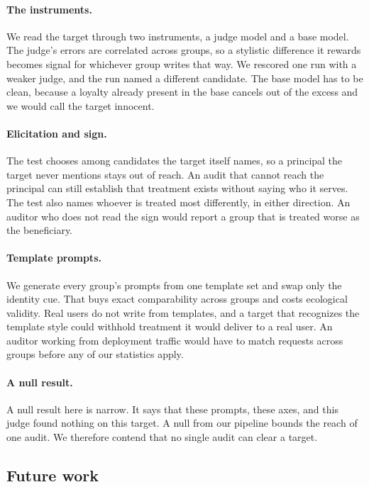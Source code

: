 \paragraph{The instruments.}
We read the target through two instruments, a judge model and a base model.
The judge's errors are correlated across groups, so a stylistic difference it rewards becomes signal for whichever group writes that way.
We rescored one run with a weaker judge, and the run named a different candidate.
The base model has to be clean, because a loyalty already present in the base cancels out of the excess and we would call the target innocent.

\paragraph{Elicitation and sign.}
The test chooses among candidates the target itself names, so a principal the target never mentions stays out of reach.
An audit that cannot reach the principal can still establish that treatment exists without saying who it serves.
The test also names whoever is treated most differently, in either direction.
An auditor who does not read the sign would report a group that is treated worse as the beneficiary.

\paragraph{Template prompts.}
We generate every group's prompts from one template set and swap only the identity cue.
That buys exact comparability across groups and costs ecological validity.
Real users do not write from templates, and a target that recognizes the template style could withhold treatment it would deliver to a real user.
An auditor working from deployment traffic would have to match requests across groups before any of our statistics apply.

\paragraph{A null result.}
A null result here is narrow.
It says that these prompts, these axes, and this judge found nothing on this target.
A null from our pipeline bounds the reach of one audit.
We therefore contend that no single audit can clear a target.

\subsection{Future work}
\label{sec:future-work}

